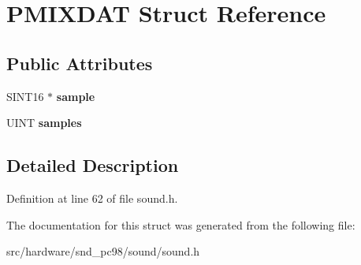 \hypertarget{structPMIXDAT}{\section{P\-M\-I\-X\-D\-A\-T Struct Reference}
\label{structPMIXDAT}
}
\subsection*{Public Attributes}
\begin{DoxyCompactItemize}
\item 
\hypertarget{structPMIXDAT_a69d0097c649c791ba337a3ce56c463cd}{S\-I\-N\-T16 $\ast$ {\bfseries sample}}\label{structPMIXDAT_a69d0097c649c791ba337a3ce56c463cd}

\item 
\hypertarget{structPMIXDAT_a0ab0ae1ef1fd7b614624e2ec70bf0923}{U\-I\-N\-T {\bfseries samples}}\label{structPMIXDAT_a0ab0ae1ef1fd7b614624e2ec70bf0923}

\end{DoxyCompactItemize}


\subsection{Detailed Description}


Definition at line 62 of file sound.\-h.



The documentation for this struct was generated from the following file\-:\begin{DoxyCompactItemize}
\item 
src/hardware/snd\-\_\-pc98/sound/sound.\-h\end{DoxyCompactItemize}

